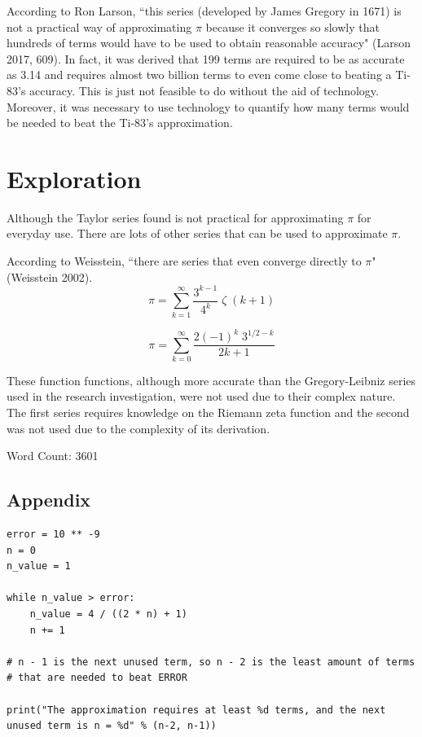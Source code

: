 \documentclass[12pt, titlepage]{article}
\begin{document}
According to Ron Larson, ``this series (developed by James Gregory in 1671) is not a practical way of approximating \(\pi\) because it converges so slowly that hundreds of terms would have to be used to obtain reasonable accuracy" (Larson 2017, 609). In fact, it was derived that 199 terms are required to be as accurate as 3.14 and requires almost two billion terms to even come close to beating a Ti-83's accuracy. This is just not feasible to do without the aid of technology. Moreover, it was necessary to use technology to quantify how many terms would be needed to beat the Ti-83's approximation.

\section{Exploration}
Although the Taylor series found is not practical for approximating \(\pi\) for everyday use. There are lots of other series that can be used to approximate \(\pi\). 

According to Weisstein, ``there are series that even converge directly to \(\pi\)" (Weisstein 2002).
\begin{equation*}
    \pi = \sum_{k=1}^{\infty} \frac{3^{k-1}}{4^{k}} \; \zeta \;(k+1)
\end{equation*}

\begin{equation*}
    \pi = \sum_{k=0}^{\infty} \frac{2(-1)^{k} \; 3^{1/2-k}}{{2k+1}}
\end{equation*}

These function functions, although more accurate than the Gregory-Leibniz series used in the research investigation, were not used due to their complex nature. The first series requires knowledge on the Riemann zeta function and the second was not used due to the complexity of its derivation.

Word Count: 3601

\newpage
\begin{appendix}
\section{Appendix}
\begin{verbatim}
error = 10 ** -9
n = 0
n_value = 1

while n_value > error:
    n_value = 4 / ((2 * n) + 1)
    n += 1

# n - 1 is the next unused term, so n - 2 is the least amount of terms 
# that are needed to beat ERROR

print("The approximation requires at least %d terms, and the next
unused term is n = %d" % (n-2, n-1))
\end{verbatim}
\end{appendix}
\end{document}
